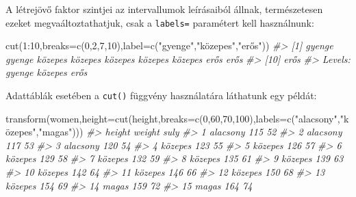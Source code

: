 \documentclass[
]{book}
\newenvironment{Shaded}{\begin{snugshade}}{\end{snugshade}}
\newcommand{\AttributeTok}[1]{\textcolor[rgb]{0.77,0.63,0.00}{#1}}
\newcommand{\CommentTok}[1]{\textcolor[rgb]{0.56,0.35,0.01}{\textit{#1}}}
\newcommand{\DecValTok}[1]{\textcolor[rgb]{0.00,0.00,0.81}{#1}}
\newcommand{\FunctionTok}[1]{\textcolor[rgb]{0.00,0.00,0.00}{#1}}
\newcommand{\NormalTok}[1]{#1}
\newcommand{\SpecialCharTok}[1]{\textcolor[rgb]{0.00,0.00,0.00}{#1}}
\newcommand{\StringTok}[1]{\textcolor[rgb]{0.31,0.60,0.02}{#1}}
\begin{document}
A létrejövő faktor szintjei az intervallumok leírásaiból állnak, természetesen ezeket megvaáltoztathatjuk, csak a \texttt{labels=} paramétert kell használnunk:

\begin{Shaded}
\begin{Highlighting}[]
\FunctionTok{cut}\NormalTok{(}\DecValTok{1}\SpecialCharTok{:}\DecValTok{10}\NormalTok{,}\AttributeTok{breaks=}\FunctionTok{c}\NormalTok{(}\DecValTok{0}\NormalTok{,}\DecValTok{2}\NormalTok{,}\DecValTok{7}\NormalTok{,}\DecValTok{10}\NormalTok{),}\AttributeTok{label=}\FunctionTok{c}\NormalTok{(}\StringTok{"gyenge"}\NormalTok{,}\StringTok{"közepes"}\NormalTok{,}\StringTok{"erős"}\NormalTok{))}
\CommentTok{\#\textgreater{}  [1] gyenge  gyenge  közepes közepes közepes közepes közepes erős    erős   }
\CommentTok{\#\textgreater{} [10] erős   }
\CommentTok{\#\textgreater{} Levels: gyenge közepes erős}
\end{Highlighting}
\end{Shaded}

Adattáblák esetében a \texttt{cut()} függvény használatára láthatunk egy példát:

\begin{Shaded}
\begin{Highlighting}[]
\FunctionTok{transform}\NormalTok{(women,}\AttributeTok{height=}\FunctionTok{cut}\NormalTok{(height,}\AttributeTok{breaks=}\FunctionTok{c}\NormalTok{(}\DecValTok{0}\NormalTok{,}\DecValTok{60}\NormalTok{,}\DecValTok{70}\NormalTok{,}\DecValTok{100}\NormalTok{),}\AttributeTok{labels=}\FunctionTok{c}\NormalTok{(}\StringTok{"alacsony"}\NormalTok{,}\StringTok{"közepes"}\NormalTok{,}\StringTok{"magas"}\NormalTok{)))}
\CommentTok{\#\textgreater{}      height weight suly}
\CommentTok{\#\textgreater{} 1  alacsony    115   52}
\CommentTok{\#\textgreater{} 2  alacsony    117   53}
\CommentTok{\#\textgreater{} 3  alacsony    120   54}
\CommentTok{\#\textgreater{} 4   közepes    123   55}
\CommentTok{\#\textgreater{} 5   közepes    126   57}
\CommentTok{\#\textgreater{} 6   közepes    129   58}
\CommentTok{\#\textgreater{} 7   közepes    132   59}
\CommentTok{\#\textgreater{} 8   közepes    135   61}
\CommentTok{\#\textgreater{} 9   közepes    139   63}
\CommentTok{\#\textgreater{} 10  közepes    142   64}
\CommentTok{\#\textgreater{} 11  közepes    146   66}
\CommentTok{\#\textgreater{} 12  közepes    150   68}
\CommentTok{\#\textgreater{} 13  közepes    154   69}
\CommentTok{\#\textgreater{} 14    magas    159   72}
\CommentTok{\#\textgreater{} 15    magas    164   74}
\end{Highlighting}
\end{Shaded}
\end{document}

